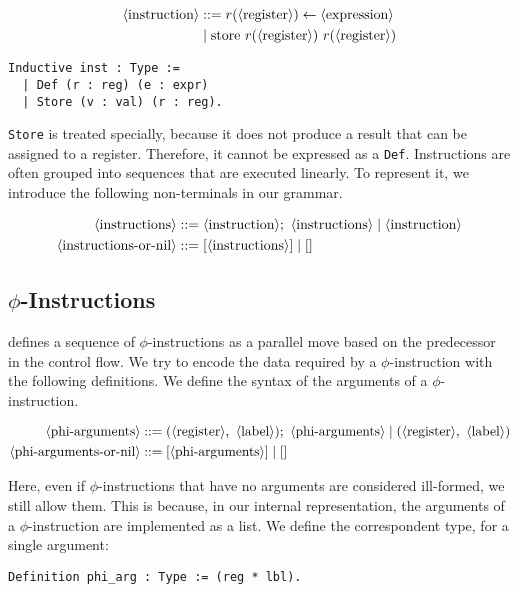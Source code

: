 \begin{align*}
\langle\text{instruction}\rangle &::= r( \langle\text{register}\rangle ) \leftarrow \langle\text{expression}\rangle \\
&\mid \text{store} \ r( \langle\text{register}\rangle ) \ r( \langle\text{register}\rangle )
\end{align*}

\begin{lstlisting}[style=Rocq]
Inductive inst : Type :=
  | Def (r : reg) (e : expr)
  | Store (v : val) (r : reg).
\end{lstlisting}

\texttt{Store} is treated specially, because it does not produce a result that can be assigned to a register. Therefore, it cannot be expressed as a \texttt{Def}.
Instructions are often grouped into sequences that are executed linearly. To represent it, we introduce the following non-terminals in our grammar.

\begin{align*}
\langle\text{instructions}\rangle &::= \langle\text{instruction}\rangle ; \ \langle\text{instructions}\rangle \mid \langle\text{instruction}\rangle \\
\langle\text{instructions-or-nil}\rangle &::= [ \langle\text{instructions}\rangle ] \mid []
\end{align*}

\subsection{$\phi$-Instructions}

 defines a sequence of $\phi$-instructions as a parallel move based on the predecessor in the control flow.
We try to encode the data required by a $\phi$-instruction with the following definitions. We define the syntax of the arguments of a $\phi$-instruction.

\begin{align*}
\nt{phi-arguments} &::= ( \nt{register} , \ \nt{label} ) ; \ \nt{phi-arguments} \mid (\nt{register} , \ \nt{label}) \\
\nt{phi-arguments-or-nil} &::= [ \nt{phi-arguments} ] \mid []
\end{align*}

Here, even if $\phi$-instructions that have no arguments are considered ill-formed, we still allow them. This is because, in our internal representation, the arguments of a $\phi$-instruction are implemented as a list.
We define the correspondent type, for a single argument:

\begin{lstlisting}[style=Rocq]
Definition phi_arg : Type := (reg * lbl).
\end{lstlisting}

